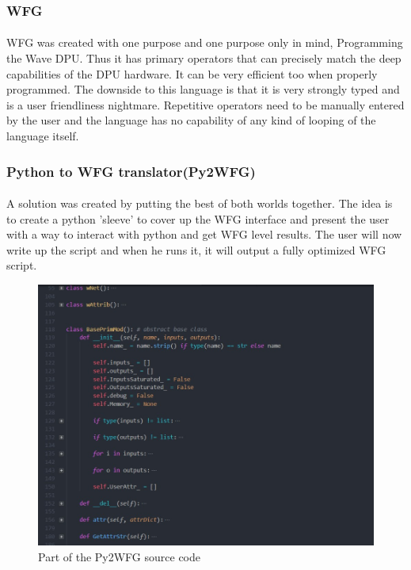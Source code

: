 \subsubsection*{WFG}
\paragraph{}
WFG was created with one purpose and one purpose only in mind, Programming the Wave DPU. Thus it has primary operators that can precisely match the deep capabilities of the DPU hardware. It can be very efficient too when properly programmed. The downside to this language is that it is very strongly typed and is a user friendliness nightmare. Repetitive operators need to be manually entered by the user and the language has no capability of any kind of looping of the language itself.

\subsubsection{Python to WFG translator(Py2WFG)}
\paragraph{}
A solution was created by putting the best of both worlds together. The idea is to create a python 'sleeve' to cover up the WFG interface and present the user with a way to interact with python and get WFG level results. The user will now write up the script and when he runs it, it will output a fully optimized WFG script. 

\begin{figure}[h]
    \centering
    \includegraphics[trim=0cm 0cm 0cm 0cm, clip=true,scale=0.6]{figures/py2wfg_src.jpg}
    \caption{Part of the Py2WFG source code\label{Fig:py2src}}\vspace{-4mm}
    \end{figure}

